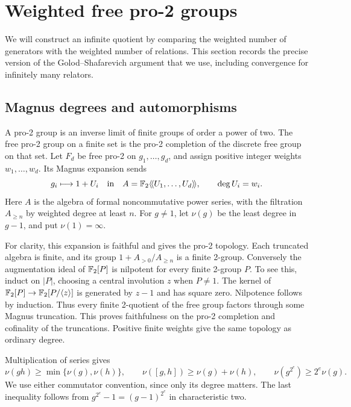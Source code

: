 \section{Weighted free pro-2 groups}
\label{sec:weighted}

We will construct an infinite quotient by comparing the weighted number of generators with the weighted number of relations. This section records the precise version of the Golod--Shafarevich argument that we use, including convergence for infinitely many relators.

\subsection{Magnus degrees and automorphisms}

A pro-2 group is an inverse limit of finite groups of order a power of two. The free pro-2 group on a finite set is the pro-2 completion of the discrete free group on that set. Let $F_d$ be free pro-2 on $g_1,\ldots,g_d$, and assign positive integer weights $w_1,\ldots,w_d$. Its Magnus expansion sends
\[
 g_i\longmapsto1+U_i
 \quad\text{in}\quad
 A=\mathbb F_2\langle\!\langle U_1,\ldots,U_d\rangle\!\rangle,
 \qquad \deg U_i=w_i.
\]
Here $A$ is the algebra of formal noncommutative power series, with the filtration $A_{\ge n}$ by weighted degree at least $n$. For $g\ne1$, let $\nu(g)$ be the least degree in $g-1$, and put $\nu(1)=\infty$.

For clarity, this expansion is faithful and gives the pro-2 topology. Each truncated algebra is finite, and its group $1+A_{>0}/A_{\ge n}$ is a finite 2-group. Conversely the augmentation ideal of $\mathbb F_2[P]$ is nilpotent for every finite 2-group $P$. To see this, induct on $|P|$, choosing a central involution $z$ when $P\ne1$. The kernel of $\mathbb F_2[P]\to\mathbb F_2[P/\langle z\rangle]$ is generated by $z-1$ and has square zero. Nilpotence follows by induction. Thus every finite 2-quotient of the free group factors through some Magnus truncation. This proves faithfulness on the pro-2 completion and cofinality of the truncations. Positive finite weights give the same topology as ordinary degree.

Multiplication of series gives
\begin{equation}\label{eq:degree-rules}
 \nu(gh)\ge\min\{\nu(g),\nu(h)\},\qquad
 \nu([g,h])\ge\nu(g)+\nu(h),\qquad
 \nu(g^{2^e})\ge2^e\nu(g).
\end{equation}
We use either commutator convention, since only its degree matters. The last inequality follows from $g^{2^e}-1=(g-1)^{2^e}$ in characteristic two.

